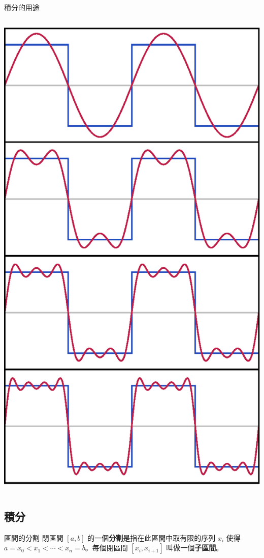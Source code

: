 \documentclass{beamer}
\theoremstyle{remark}
\begin{document}
\begin{CJK}{UTF8}{bsmi}
\begin{frame}{積分的用途}
\begin{columns}
\begin{column}{0.5\textwidth}
\begin{center}
	\includegraphics[height=0.8\textheight]{FourierSeries}
      \end{center}
    \end{column}
  \end{columns}
\end{frame}

\subsection{積分}
\begin{frame}{區間的分割}
  閉區間 $[a,b]$ 的一個\textbf{分割}是指在此區間中取有限的序列 $x_i$ 使得 $a = x_0 < x_1 < \cdots < x_n = b$。每個閉區間
  $[x_i, x_{i+1}]$ 叫做一個\textbf{子區間}。
\end{frame}


\end{CJK}
\end{document}
